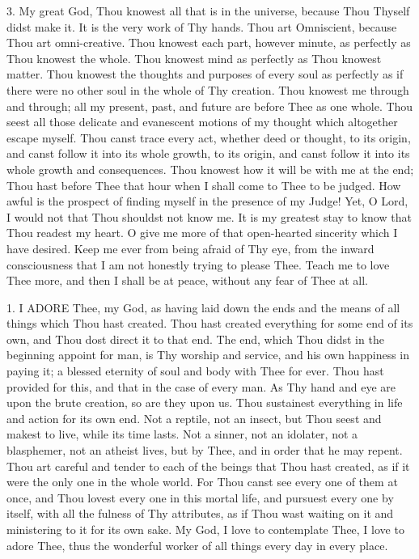 3. My great God, Thou knowest
all that is in the universe, because Thou Thyself didst make it. It is
the very work of Thy hands. Thou art Omniscient, because Thou art
omni-creative. Thou knowest each part, however minute, as perfectly as
Thou knowest the whole. Thou knowest mind as perfectly as Thou knowest
matter. Thou knowest the thoughts and purposes of every soul as
perfectly as if there were no other soul in the whole of Thy creation.
Thou knowest me through and through; all my present, past, and future
are before Thee as one whole. Thou seest all those delicate and
evanescent motions of my thought which altogether escape myself. Thou
canst trace every act, whether deed or thought, to its origin, and canst
follow it into its whole growth, to its origin, and canst follow it into
its whole growth and consequences. Thou knowest how it will be with me
at the end; Thou hast before Thee that hour when I shall come to Thee to
be judged. How awful is the prospect of finding myself in the
presence of my Judge! Yet, O Lord, I would not that Thou shouldst not
know me. It is my greatest stay to know that Thou readest my heart. O
give me more of that open-hearted sincerity which I have desired. Keep
me ever from being afraid of Thy eye, from the inward consciousness that
I am not honestly trying to please Thee. Teach me to love Thee more, and
then I shall be at peace, without any fear of Thee at all.


1. I ADORE
Thee, my God, as having laid down the ends and the means of all things
which Thou hast created. Thou hast created everything for some end of
its own, and Thou dost direct it to that end. The end, which Thou didst
in the beginning appoint for man, is Thy worship and service, and his
own happiness in paying it; a blessed eternity of soul and body with
Thee for ever. Thou hast provided for this, and that in the case of
every man. As Thy hand and eye are upon the brute creation, so are they
upon us. Thou sustainest everything in life and action for its own end.
Not a reptile, not an insect, but Thou seest and makest to live, while
its time lasts. Not a sinner, not an idolater, not a blasphemer, not an
atheist lives, but by Thee, and in order that he may repent. Thou art
careful and tender to each of the beings that Thou hast created, as if
it were the only one in the whole world. For Thou canst see every one of
them at once, and Thou lovest every one in this mortal life, and
pursuest every one by itself, with all the fulness of Thy attributes, as
if Thou wast waiting on it and ministering to it for its own sake. My
God, I love to contemplate Thee, I love to adore Thee, thus the
wonderful worker of all things every day in every place.


